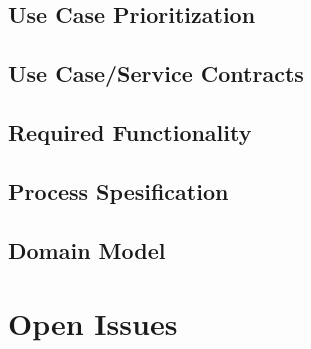 \documentclass[12pt]{article}
\begin{document}
\subsection{Use Case Prioritization}

\subsection{Use Case/Service Contracts}

\subsection{Required Functionality}

\subsection{Process Spesification}

\subsection{Domain Model}


\section{Open Issues}
\end{document}

